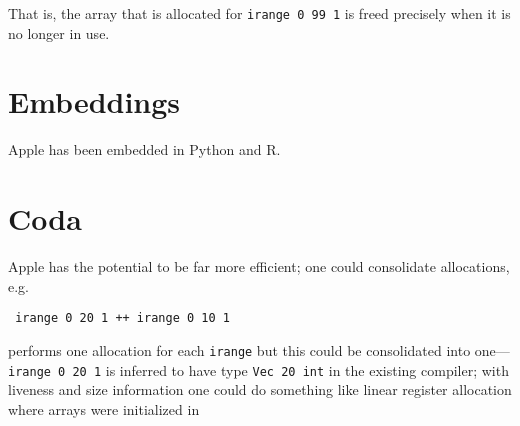 \documentclass[sigplan,screen]{acmart}
\begin{document}
That is, the array that is allocated for {\tt irange 0 99 1} is freed precisely when it is no longer in use.



\section{Embeddings}

Apple has been embedded in Python and R.

\section{Coda}

Apple has the potential to be far more efficient; one could consolidate allocations, e.g.

\begin{verbatim}
 irange 0 20 1 ++ irange 0 10 1
\end{verbatim}

performs one allocation for each {\tt irange} but this could be consolidated into one---{\tt irange 0 20 1} is inferred to have type {\tt Vec 20 int} in the existing compiler; with liveness and size information one could do something like linear register allocation where arrays were initialized in
\end{document}
